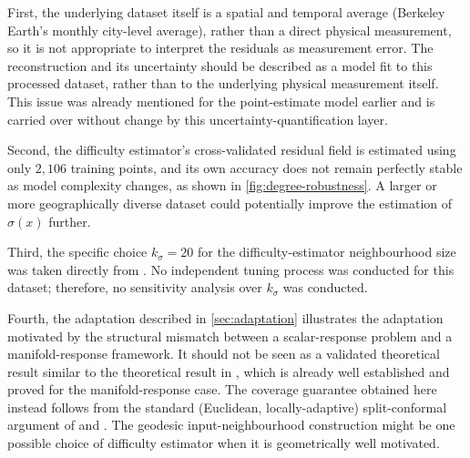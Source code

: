 First, the underlying dataset itself is a spatial and temporal average (Berkeley Earth's monthly city-level average), rather than a direct physical measurement, so it is not appropriate to interpret the residuals as measurement error. The reconstruction and its uncertainty should be described as a model fit to this processed dataset, rather than to the underlying physical measurement itself. This issue was already mentioned for the point-estimate model earlier and is carried over without change by this uncertainty-quantification layer. 

Second, the difficulty estimator's cross-validated residual field is estimated using only $2{,}106$ training points, and its own accuracy does not remain perfectly stable as model complexity changes, as shown in \cref{fig:degree-robustness}. A larger or more geographically diverse dataset could potentially improve the estimation of $\hat\sigma(x)$ further. 

Third, the specific choice $k_\sigma=20$ for the difficulty-estimator neighbourhood size was taken directly from \citet{amirishahbazi2026}. No independent tuning process was conducted for this dataset; therefore, no sensitivity analysis over $k_\sigma$ was conducted.

Fourth, the adaptation described in \cref{sec:adaptation} illustrates the adaptation motivated by the structural mismatch between a scalar-response problem and a manifold-response framework. It should not be seen as a validated theoretical result similar to the theoretical result in \citeauthor{amirishahbazi2026}, which is already well established and proved for the manifold-response case. The coverage guarantee obtained here instead follows from the standard (Euclidean, locally-adaptive) split-conformal argument of \citet{lei2018} and \citet{romano2019}. The geodesic input-neighbourhood construction might be one possible choice of difficulty estimator when it is geometrically well motivated.

